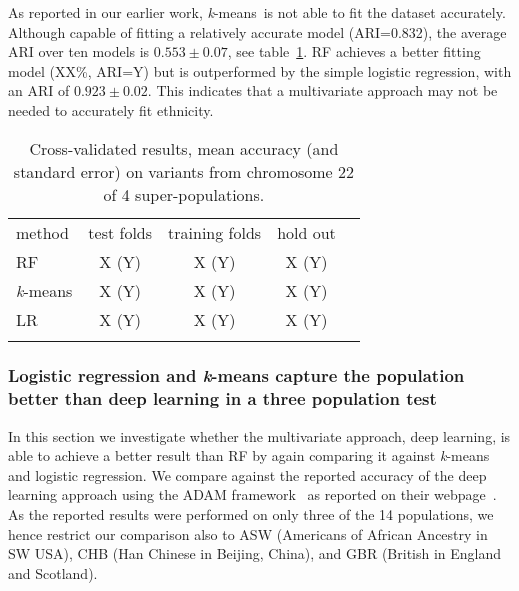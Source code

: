 \documentclass{llncs}
\newcommand{\kMeans}{\textit{k}-means}
\begin{document}
{
As reported in our earlier work, \kMeans\ is not able to fit the dataset accurately.
Although capable of fitting a relatively accurate model (ARI=0.832), the average ARI over ten models is  \(0.553 \pm 0.07\), see table~\ref{RF}.
RF achieves a better fitting model (XX\%, ARI=Y) but is outperformed by the simple logistic regression, with an ARI of \(0.923 \pm 0.02\).
This indicates that a multivariate approach may not be needed to accurately fit ethnicity. 


\begin{table}
\caption{Cross-validated results, mean accuracy (and standard error) on variants from chromosome 22 of 4 super-populations.}
\begin{center}
\renewcommand{\arraystretch}{1.4}
\setlength\tabcolsep{3pt}
\begin{tabular}{lcccc}
\hline\noalign{\smallskip}
method  & test folds & training folds & hold out \\
RF  & X (Y) & X (Y) & X (Y) \\
\kMeans & X (Y) & X (Y) & X (Y) \\
LR & X (Y) & X (Y) & X (Y) \\
\noalign{\smallskip}
\hline
\label{RF}
\end{tabular}
\end{center}
\end{table}




\subsubsection{Logistic regression and \kMeans{} capture the population better than deep learning in a three population test}
In this section we investigate whether the multivariate approach, deep learning, is able to achieve a better result than
RF by again comparing it against \kMeans{} and logistic regression.  We compare against the reported accuracy of the
deep learning approach using the {\sc ADAM} framework~\cite{Massie2013} as reported on their webpage~\cite{Ferguson}.
As the reported results were performed on only three of the 14 populations, we hence restrict our comparison also to ASW
(Americans of African Ancestry in SW USA), CHB (Han Chinese in Beijing, China), and GBR (British in England and
Scotland).

}
\end{document}
